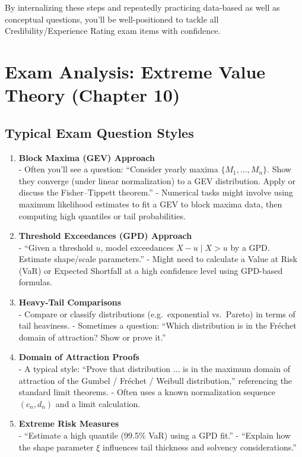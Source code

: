 \documentclass[13pt,a4paper]{article}
\begin{document}
\noindent
By internalizing these steps and repeatedly practicing data-based as well as conceptual questions, you’ll be well-positioned to tackle all Credibility/Experience Rating exam items with confidence.

\section{Exam Analysis: Extreme Value Theory (Chapter 10)}
\label{sec:evt_exam_analysis}

\subsection{Typical Exam Question Styles}
\begin{enumerate}
  \item \textbf{Block Maxima (GEV) Approach}\\
    - Often you’ll see a question: “Consider yearly maxima \(\{M_1,\ldots,M_n\}\). Show they converge (under linear normalization) to a GEV distribution. Apply or discuss the Fisher–Tippett theorem.”  
    - Numerical tasks might involve using maximum likelihood estimates to fit a GEV to block maxima data, then computing high quantiles or tail probabilities.

  \item \textbf{Threshold Exceedances (GPD) Approach}\\
    - “Given a threshold \(u\), model exceedances \(X-u \mid X>u\) by a GPD. Estimate shape/scale parameters.”  
    - Might need to calculate a Value at Risk (VaR) or Expected Shortfall at a high confidence level using GPD-based formulas.

  \item \textbf{Heavy-Tail Comparisons}\\
    - Compare or classify distributions (e.g.\ exponential vs.\ Pareto) in terms of tail heaviness.  
    - Sometimes a question: “Which distribution is in the Fréchet domain of attraction? Show or prove it.”

  \item \textbf{Domain of Attraction Proofs}\\
    - A typical style: “Prove that distribution \(\ldots\) is in the maximum domain of attraction of the Gumbel / Fréchet / Weibull distribution,” referencing the standard limit theorems.  
    - Often uses a known normalization sequence \((c_n, d_n)\) and a limit calculation.

  \item \textbf{Extreme Risk Measures}\\
    - “Estimate a high quantile (99.5\% VaR) using a GPD fit.”  
    - “Explain how the shape parameter \(\xi\) influences tail thickness and solvency considerations.”

\end{enumerate}
\end{document}
